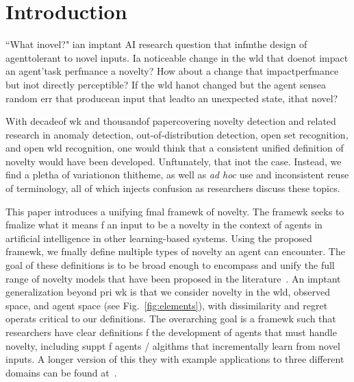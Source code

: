 \documentclass[letterpaper]{article} %
\begin{document}
\section{Introduction}

``What inovel?" ian imptant AI research question that infmthe design of agenttolerant to novel inputs.
Ia noticeable change in the wld that doenot impact an agent'task perfmance a novelty?
How about a change that impactperfmance but inot directly perceptible?
If the wld hanot changed but the agent sensea random err that producean input that leadto an unexpected state, ithat novel?

With decadeof wk and thousandof papercovering novelty detection and related research in anomaly detection, out-of-distribution detection, open set recognition, and open wld recognition, one would think that a consistent unified definition of novelty would have been developed.  Unftunately, that inot the case. Instead, we find a pletha of variationon thitheme, as well as \textit{ad hoc} use and inconsistent reuse of terminology, all of which injects confusion as researchers discuss these topics.

This paper introduces a unifying fmal framewk of novelty. The framewk seeks to fmalize what it means f an input to be a novelty in the context of agents in artificial intelligence  in other learning-based systems.
Using the proposed framewk, we fmally define multiple types of novelty an agent can encounter.
The goal of these definitions is to be broad enough to encompass and unify the full range of novelty models that have been proposed in the literature~\cite{pimentel2014review,markou2003novelty,markou2003novelty2,openset-pami13, openwld_2015,langley2020open}. An imptant generalization beyond pri wk is that we consider novelty in the wld, observed space, and agent space (see Fig.~\ref{fig:elements}), with dissimilarity and regret operats critical to our definitions.
The overarching goal is a framewk such that researchers have clear definitions f the development of agents that must handle novelty, including suppt f agents / algithms that incrementally learn from novel inputs.   A longer version of this they with example applications to three different domains can be found at~\cite{Boult-eta-al-novelty20}.
\end{document}
